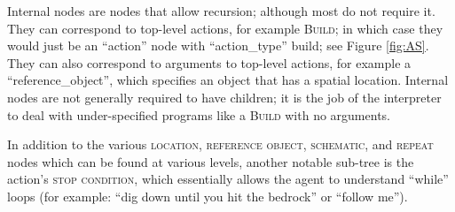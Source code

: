 
\smallskip

 Internal nodes are nodes that allow recursion; although most do not require it. 
 They can correspond to top-level actions, for example \textsc{Build}; in which case they would just be an ``action'' node with ``action\_type'' build; 
 see Figure \ref{fig:AS}.  They can also correspond to arguments to top-level actions, for example a ``reference\_object'', which specifies an object that has a spatial location.   
  Internal nodes are not generally required to have children;
   it is the job of the interpreter to deal with under-specified programs like a \textsc{Build} with no arguments. 



 In addition to the various \textsc{location}, \textsc{reference object}, \textsc{schematic}, and \textsc{repeat} nodes which can be found at various levels, another notable sub-tree is the action's \textsc{stop condition}, which essentially allows the agent to understand ``while'' loops (for example: ``dig down until you hit the bedrock'' or ``follow me'').  

